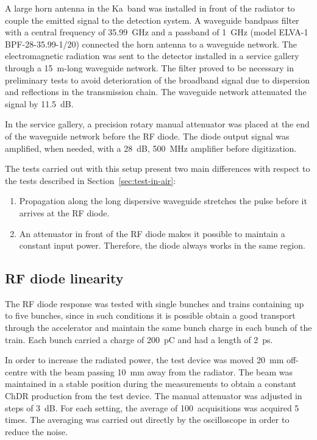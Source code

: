 
A large horn antenna in the Ka~band was installed in front of the radiator to couple the emitted signal to the detection system. A waveguide bandpass filter with a central frequency of 35.99~GHz and a passband of 1~GHz (model ELVA-1 BPF-28-35.99-1/20) connected the horn antenna to a waveguide network. The electromagnetic radiation was sent to the detector installed in a service gallery through a 15~m-long waveguide network. The filter proved to be necessary in preliminary tests to avoid deterioration of the broadband signal due to dispersion and reflections in the transmission chain. The waveguide network attenuated the signal by 11.5~dB. 

In the service gallery, a precision rotary manual attenuator was placed at the end of the waveguide network before the RF diode. The diode output signal was amplified, when needed, with a 28~dB, 500~MHz amplifier before digitization. 






The tests carried out with this setup present two main differences with respect to the tests described in Section~\ref{sec:test-in-air}:
\begin{enumerate}
    \item Propagation along the long dispersive waveguide stretches the pulse before it arrives at the RF diode.
    \item An attenuator in front of the RF diode makes it possible to maintain a constant input power. Therefore, the diode always works in the same region.
\end{enumerate}



\subsection{RF diode linearity}

The RF diode response was tested with single bunches and trains containing up to five bunches, since in such conditions it is possible obtain a good transport through the accelerator and maintain the same bunch charge in each bunch of the train. Each bunch carried a charge of 200~pC and had a length of 2~ps. 

In order to increase the radiated power, the test device was moved 20~mm off-centre with the beam passing 10~mm away from the radiator. The beam was maintained in a stable position during the measurements to obtain a constant ChDR production from the test device. The manual attenuator was adjusted in steps of 3~dB. For each setting, the average of 100~acquisitions was acquired 5 times. The averaging was carried out directly by the oscilloscope in order to reduce the noise. 


